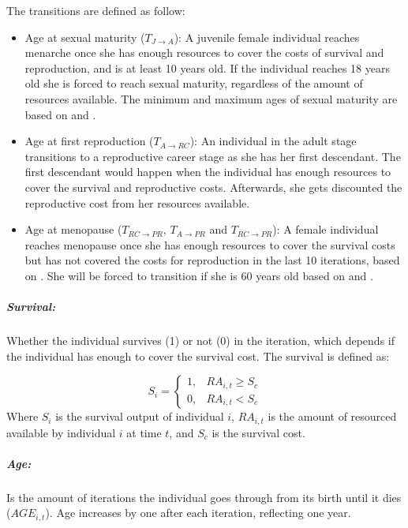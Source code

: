 \documentclass{article}
\begin{document}
The transitions are defined as follow:
        \begin{itemize}
            \item Age at sexual maturity ($T_{J \to A}$): A juvenile female individual reaches menarche once she has enough resources to cover the costs of survival and reproduction, and is at least 10 years old. If the individual reaches 18 years old she is forced to reach sexual maturity, regardless of the amount of resources available. The minimum and maximum ages of sexual maturity are based on \cite{morabia1998international} and \cite{kramer2010teen}.
            \item Age at first reproduction ($T_{A \to RC}$): An individual in the adult stage transitions to a reproductive career stage as she has her first descendant. The first descendant would happen when the individual has enough resources to cover the survival and reproductive costs. Afterwards, she gets discounted the reproductive cost from her resources available.
            \item Age at menopause ($T_{RC \to PR}$, $T_{A \to PR}$ and $T_{RC \to PR}$): A female individual reaches menopause once she has enough resources to cover the survival costs but has not covered the costs for reproduction in the last 10 iterations, based on \cite{towner2016women}. She will be forced to transition if she is 60 years old based on \cite{morabia1998international} and \cite{thomas2001international}.
        \end{itemize}

\subparagraph{Survival:} 

Whether the individual survives (1) or not (0) in the iteration, which depends if the individual has enough to cover the survival cost. The survival is defined as:

\begin{equation}
    S_i=\begin{cases}
    1,& RA_{i,t} \geq S_c\\
    0,& RA_{i,t} < S_c
\end{cases}
\end{equation}
        Where $S_i$ is the survival output of individual $i$, $RA_{i,t}$ is the amount of resourced available by individual $i$ at time $t$, and $S_c$ is the survival cost.

\subparagraph{Age:} 

Is the amount of iterations the individual goes through from its birth until it dies ($AGE_{i,t}$). Age increases by one after each iteration, reflecting one year.
        
\end{document}
